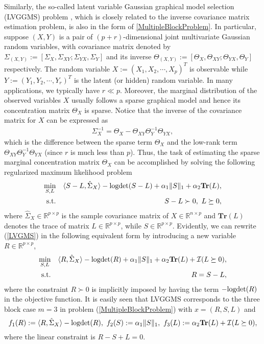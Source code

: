 \documentclass{mcom-l}
\theoremstyle{definition}
\theoremstyle{remark}
\numberwithin{equation}{section}
\begin{document}
Similarly, the so-called latent variable Gaussian graphical model selection (LVGGMS) problem \cite{Chandrasekaran2012}, which  is closely related to the inverse covariance matrix estimation problem, is also in the form of \eqref{MultipleBlockProblem}. In particular, suppose $(X,Y)$ is a pair of $(p+r)$-dimensional joint multivariate Gaussian random variables, with covariance matrix denoted by $\Sigma_{(X,Y)} := [\Sigma_X,\Sigma_{XY};\Sigma_{YX}, \Sigma_Y ]$ and its inverse $\Theta_{(X,Y)} :=[ \Theta_X,\Theta_{XY};\Theta_{YX}, \Theta_Y ]$ respectively. The random variable $X:= (X_1,X_2,\cdots,X_p)^T$ is observable while $Y := (Y_1,Y_2,\cdots,Y_r)^T$ is the latent (or hidden) random variable. In many applications, we typically have $r\ll p$. Moreover, the marginal distribution of the observed variables $X$ usually follows a sparse graphical model and hence its concentration matrix $ \Theta_X$ is sparse. Notice that the inverse of the covariance matrix for $X$ can be expressed as
\begin{align}
\Sigma_X^{-1} = \Theta_X - \Theta_{XY} \Theta_Y^{-1} \Theta_{YX}\label{eqInverseCovariance},
\end{align}
which is the difference between the sparse term $\Theta_X$ and the low-rank term $\Theta_{XY} \Theta_Y^{-1} \Theta_{YX}$ (since $r$ is much less than $p$). Thus, the task of estimating the sparse marginal concentration matrix $\Theta_X$ can be accomplished by solving the following regularized maximum likelihood problem
\begin{eqnarray}\label{LVGMS}
\min_{S,L}&&\langle S - L, \hat{\Sigma}_X \rangle - \hbox{logdet}(S - L) + \alpha_1 \| S \|_1 + \alpha_2 {\mathbf{Tr}}(L),\\
\hbox{s.t.}&&S - L \succ 0,\ L\succeq 0,\nonumber
\end{eqnarray}
where $\hat{\Sigma}_X \in \mathbb{R}^{p\times p}$ is the sample covariance matrix of $X \in \mathbb{R}^{n\times p}$ and ${\mathbf{Tr}}(L)$ denotes the trace of matrix $L \in \mathbb{R}^{p\times p}$, while $S \in \mathbb{R}^{p\times p}$. Evidently, we can rewrite (\ref{LVGMS}) in the following equivalent form by introducing a new variable $R \in \mathbb{R}^{p\times p}$,
\begin{eqnarray}\label{LVGMSeuqal}
\min_{S,L}&&\langle R, \hat{\Sigma}_X \rangle - \hbox{logdet}(R) + \alpha_1 \| S \|_1 + \alpha_2 {\mathbf{Tr}}(L) + {\mathcal{I}}(L\succeq 0),\\
\hbox{s.t.}&&R = S - L,\nonumber
\end{eqnarray}
where the constraint $R\succ 0$ is implicitly imposed by having the term $-\hbox{logdet}(R)$ in the objective function. It is easily seen that LVGGMS corresponds to the three block case $m = 3$ in problem (\ref{MultipleBlockProblem}) with $x = (R, S, L)$ and
$$
f_1(R) := \langle R, \hat{\Sigma}_X \rangle - \hbox{logdet}(R),\  f_2(S) := \alpha_1 \|S\|_1,\  f_3(L) := \alpha_2 {\mathbf{Tr}}(L) + {\mathcal{I}}(L\succeq 0),
$$
where the linear constraint is $R - S + L = 0$.
\end{document}
